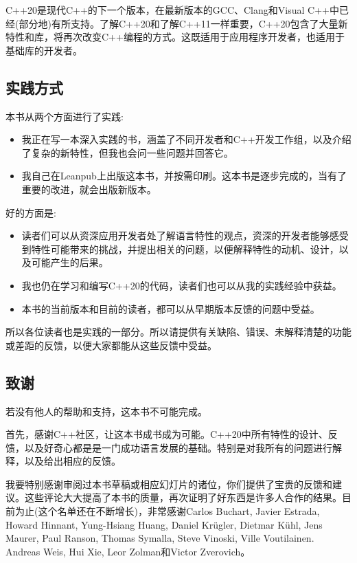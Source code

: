 
C++20是现代C++的下一个版本，在最新版本的GCC、Clang和Visual C++中已经(部分地)有所支持。了解C++20和了解C++11一样重要，C++20包含了大量新特性和库，将再次改变C++编程的方式。这既适用于应用程序开发者，也适用于基础库的开发者。

\subsection*{实践方式}

本书从两个方面进行了实践:

\begin{itemize}
\item
我正在写一本深入实践的书，涵盖了不同开发者和C++开发工作组，以及介绍了复杂的新特性，但我也会问一些问题并回答它。

\item
我自己在Leanpub上出版这本书，并按需印刷。这本书是逐步完成的，当有了重要的改进，就会出版新版本。
\end{itemize}

好的方面是:

\begin{itemize}
\item
读者们可以从资深应用开发者处了解语言特性的观点，资深的开发者能够感受到特性可能带来的挑战，并提出相关的问题，以便解释特性的动机、设计，以及可能产生的后果。

\item
我也仍在学习和编写C++20的代码，读者们也可以从我的实践经验中获益。

\item
本书的当前版本和目前的读者，都可以从早期版本反馈的问题中受益。
\end{itemize}

所以各位读者也是实践的一部分。所以请提供有关缺陷、错误、未解释清楚的功能或差距的反馈，以便大家都能从这些反馈中受益。

\subsection*{致谢}

若没有他人的帮助和支持，这本书不可能完成。

首先，感谢C++社区，让这本书成书成为可能。C++20中所有特性的设计、反馈，以及好奇心都是是一门成功语言发展的基础。特别是对我所有的问题进行解释，以及给出相应的反馈。

我要特别感谢审阅过本书草稿或相应幻灯片的诸位，你们提供了宝贵的反馈和建议。这些评论大大提高了本书的质量，再次证明了好东西是许多人合作的结果。目前为止(这个名单还在不断增长)，非常感谢Carlos Buchart, Javier Estrada, Howard Hinnant, Yung-Hsiang Huang, Daniel Kr{\"u}gler, Dietmar K{\"u}hl, Jens Maurer, Paul Ranson, Thomas Symalla, Steve Vinoski, Ville Voutilainen. Andreas Weis, Hui Xie, Leor Zolman和Victor Zverovich。

